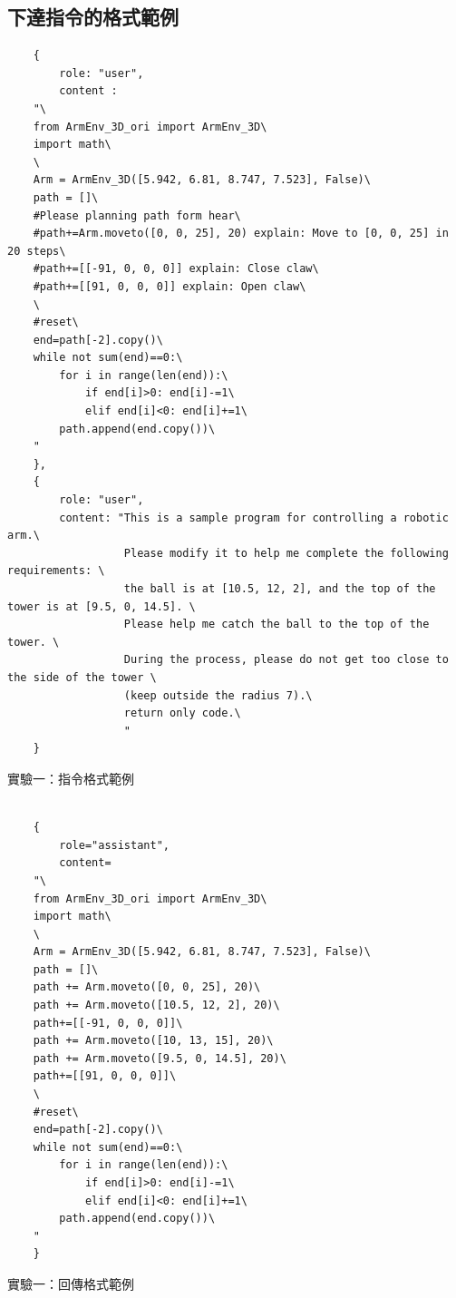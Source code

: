 \documentclass[class=NCU_thesis, crop=false]{standalone}
\begin{document}
\subsection{下達指令的格式範例}
\begin{listing}[h]
    \begin{verbatim}
    {     
        role: "user",
        content : 
    "\
    from ArmEnv_3D_ori import ArmEnv_3D\
    import math\
    \
    Arm = ArmEnv_3D([5.942, 6.81, 8.747, 7.523], False)\
    path = []\
    #Please planning path form hear\
    #path+=Arm.moveto([0, 0, 25], 20) explain: Move to [0, 0, 25] in 20 steps\
    #path+=[[-91, 0, 0, 0]] explain: Close claw\
    #path+=[[91, 0, 0, 0]] explain: Open claw\
    \
    #reset\
    end=path[-2].copy()\
    while not sum(end)==0:\
        for i in range(len(end)):\
            if end[i]>0: end[i]-=1\
            elif end[i]<0: end[i]+=1\
        path.append(end.copy())\
    "
    },
    {
        role: "user", 
        content: "This is a sample program for controlling a robotic arm.\
                  Please modify it to help me complete the following requirements: \
                  the ball is at [10.5, 12, 2], and the top of the tower is at [9.5, 0, 14.5]. \
                  Please help me catch the ball to the top of the tower. \
                  During the process, please do not get too close to the side of the tower \
                  (keep outside the radius 7).\
                  return only code.\
                  "
    }
    \end{verbatim}
\caption{實驗一：指令格式範例} 
\end{listing}

\begin{listing}[h]
    \begin{verbatim}

    {
        role="assistant",
        content=
    "\
    from ArmEnv_3D_ori import ArmEnv_3D\
    import math\
    \
    Arm = ArmEnv_3D([5.942, 6.81, 8.747, 7.523], False)\
    path = []\
    path += Arm.moveto([0, 0, 25], 20)\
    path += Arm.moveto([10.5, 12, 2], 20)\
    path+=[[-91, 0, 0, 0]]\
    path += Arm.moveto([10, 13, 15], 20)\
    path += Arm.moveto([9.5, 0, 14.5], 20)\
    path+=[[91, 0, 0, 0]]\
    \
    #reset\
    end=path[-2].copy()\
    while not sum(end)==0:\
        for i in range(len(end)):\
            if end[i]>0: end[i]-=1\
            elif end[i]<0: end[i]+=1\
        path.append(end.copy())\
    "
    }

    \end{verbatim}
\caption{實驗一：回傳格式範例} 
\end{listing}
\clearpage
\end{document}
